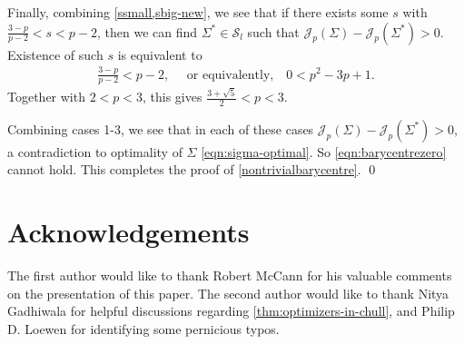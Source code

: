\documentclass[preprint, reqno]{amsart}
\theoremstyle{definition}
\numberwithin{equation}{section}
\begin{document}
Finally, combining \cref{ssmall,sbig-new}, we see that if there exists
some $s$ with $\frac{3-p}{p-2} < s < p-2$, then we can find $\Sigma^*
\in \mathcal{S}_l$ such that $\mathscr{J}_p(\Sigma) -
\mathscr{J}_p(\Sigma^*) > 0$. Existence of such $s$ is equivalent to
\begin{align*}
  \frac{3-p}{p-2} < p-2, \quad \text{ or equivalently,} \quad 0 <
  p^2 - 3p + 1.
\end{align*}
Together with $2 < p < 3$, this gives $\frac{3 + \sqrt 5}{2} < p < 3$.

Combining cases 1-3, we see that in each of these cases $\mathscr
J_p(\Sigma) - \mathscr J_p(\Sigma^*) > 0$, a contradiction to
optimality of $\Sigma$ \eqref{eqn:sigma-optimal}. So
\eqref{eqn:barycentrezero} cannot hold. This completes the proof of
\cref{nontrivialbarycentre}. \qed

\section*{Acknowledgements}

The first author would like to thank Robert McCann for his valuable
comments on the presentation of this paper. The second author would
like to thank Nitya Gadhiwala for helpful discussions regarding
\cref{thm:optimizers-in-chull}, and Philip D. Loewen for identifying
some pernicious typos.




\end{document}
